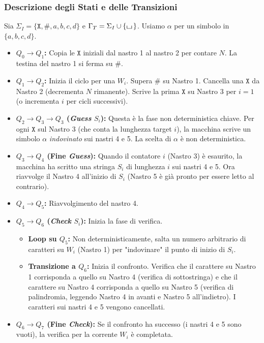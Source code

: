 \documentclass[a4paper]{article}
\theoremstyle{definition} %
\newcommand{\blankS}{\ensuremath{\raisebox{-0.15ex}{\scalebox{1.3}[0.7]{$\sqcup$}}\mkern2mu}}
\newcommand{\B}{\blankS} %
\newcommand{\Sh}{\texttt{\#}} %
\newcommand{\X}{\texttt{X}} %
\newcommand{\alphaSym}{\alpha} %
\begin{document}
\subsubsection{Descrizione degli Stati e delle Transizioni}
Sia $\Sigma_I = \{\X, \Sh, a,b,c,d\}$ e $\Gamma_T = \Sigma_I \cup \{\B\}$. Usiamo $\alphaSym$ per un simbolo in $\{a,b,c,d\}$.
\begin{itemize}
    \item \textbf{$Q_0 \to Q_1$:} Copia le $\X$ iniziali dal nastro 1 al nastro 2 per contare $N$. La testina del nastro 1 si ferma su $\Sh$.
    \item \textbf{$Q_1 \to Q_2$:} Inizia il ciclo per una $W_i$. Supera $\Sh$ su Nastro 1. Cancella una $\X$ da Nastro 2 (decrementa $N$ rimanente). Scrive la prima $\X$ su Nastro 3 per $i=1$ (o incrementa $i$ per cicli successivi).
    \item \textbf{$Q_2 \to Q_3 \to Q_3$ (\textit{Guess} $S_i$):} Questa è la fase non deterministica chiave. Per ogni $\X$ sul Nastro 3 (che conta la lunghezza target $i$), la macchina scrive un simbolo $\alphaSym$ \textit{indovinato} sui nastri 4 e 5. La scelta di $\alphaSym$ è non deterministica.
    \item \textbf{$Q_3 \to Q_4$ (Fine \textit{Guess}):} Quando il contatore $i$ (Nastro 3) è esaurito, la macchina ha scritto una stringa $S_i$ di lunghezza $i$ sui nastri 4 e 5. Ora riavvolge il Nastro 4 all'inizio di $S_i$ (Nastro 5 è già pronto per essere letto al contrario).
    \item \textbf{$Q_4 \to Q_5$:} Riavvolgimento del nastro 4.
    \item \textbf{$Q_5 \to Q_6$ (\textit{Check} $S_i$):} Inizia la fase di verifica.
        \begin{itemize}
            \item \textbf{Loop su $Q_5$:} Non deterministicamente, salta un numero arbitrario di caratteri su $W_i$ (Nastro 1) per "indovinare" il punto di inizio di $S_i$.
            \item \textbf{Transizione a $Q_6$:} Inizia il confronto. Verifica che il carattere su Nastro 1 corrisponda a quello su Nastro 4 (verifica di sottostringa) e che il carattere su Nastro 4 corrisponda a quello su Nastro 5 (verifica di palindromia, leggendo Nastro 4 in avanti e Nastro 5 all'indietro). I caratteri sui nastri 4 e 5 vengono cancellati.
        \end{itemize}
    \item \textbf{$Q_6 \to Q_7$ (Fine \textit{Check}):} Se il confronto ha successo (i nastri 4 e 5 sono vuoti), la verifica per la corrente $W_i$ è completata.

\end{itemize}
\end{document}
